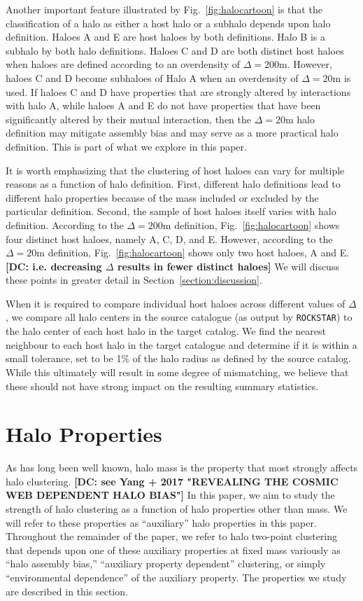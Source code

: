 \documentclass[usenatbib,fleqn]{mnras}
\begin{document}
Another important feature illustrated by Fig.~\ref{fig:halocartoon} is that the classification of a halo as either a host halo or a subhalo depends upon halo definition. Haloes A and E are host haloes by both definitions. Halo B is a subhalo by both halo definitions. Haloes C and D are both distinct host haloes when haloes are defined according to an overdensity of $\Delta=200$m. However, haloes C and D become subhaloes of Halo A when an overdensity of $\Delta=20$m is used. If haloes C and D have properties that are strongly altered by interactions with halo A, while haloes A and E do not have properties that have been significantly altered by their mutual interaction, then the $\Delta=20$m halo definition may mitigate assembly bias and may serve as a more practical halo definition. This is part of what we explore in this paper.

It is worth emphasizing that the clustering of host haloes can vary for multiple reasons as a function of halo definition. First, different halo definitions lead to different halo properties because of the mass included or excluded by the particular definition. Second, the sample of host haloes itself varies with halo definition. According to the $\Delta=200$m definition, Fig.~\ref{fig:halocartoon} shows four distinct host haloes, namely A, C, D, and E. However, according to the $\Delta=20$m definition, Fig.~\ref{fig:halocartoon} shows only two host haloes, A and E. {\bf [DC: i.e. decreasing $\Delta$ results in fewer distinct haloes]} We will discuss these points in greater detail in Section~\ref{section:discussion}.

When it is required to compare individual host haloes across different values of $\Delta$, we compare all halo centers in the source catalogue (as output by {\tt ROCKSTAR}) to the halo center of each host halo in the target catalog. We find the nearest neighbour to each host halo in the target catalogue and determine if it is within a small tolerance, set to be 1\% of the halo radius as defined by the source catalog. While this ultimately will result in some degree of mismatching, we believe that these should not have strong impact on the resulting summary statistics.


\section{Halo Properties}
\label{section:haloprops}

As has long been well known, halo mass is the property that most strongly affects halo clustering. {\bf [DC: see Yang +  2017 "REVEALING THE COSMIC WEB DEPENDENT HALO BIAS"]} In this paper, we aim to study the strength of halo clustering as a function of halo properties other than mass. We will refer to these properties as ``auxiliary'' halo properties in this paper. Throughout the remainder of the paper, we refer to halo two-point clustering that depends upon one of these auxiliary properties at fixed mass variously as ``halo assembly bias,'' ``auxiliary property dependent'' clustering, or simply ``environmental dependence'' of the auxiliary property. The properties we study are described in this section.
\end{document}
